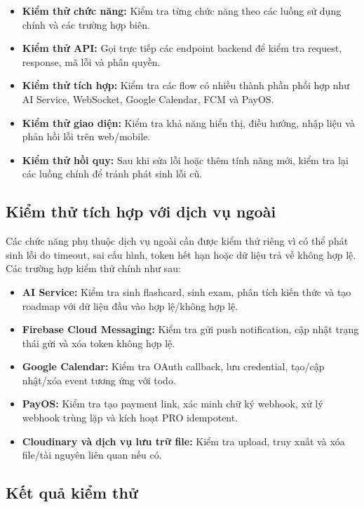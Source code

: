 \begin{itemize}
    \item \textbf{Kiểm thử chức năng:} Kiểm tra từng chức năng theo các luồng sử dụng chính và các trường hợp biên.
    \item \textbf{Kiểm thử API:} Gọi trực tiếp các endpoint backend để kiểm tra request, response, mã lỗi và phân quyền.
    \item \textbf{Kiểm thử tích hợp:} Kiểm tra các flow có nhiều thành phần phối hợp như AI Service, WebSocket, Google Calendar, FCM và PayOS.
    \item \textbf{Kiểm thử giao diện:} Kiểm tra khả năng hiển thị, điều hướng, nhập liệu và phản hồi lỗi trên web/mobile.
    \item \textbf{Kiểm thử hồi quy:} Sau khi sửa lỗi hoặc thêm tính năng mới, kiểm tra lại các luồng chính để tránh phát sinh lỗi cũ.
\end{itemize}

\subsection{Kiểm thử tích hợp với dịch vụ ngoài}
\label{subsec:integration-testing}

Các chức năng phụ thuộc dịch vụ ngoài cần được kiểm thử riêng vì có thể phát sinh lỗi do timeout, sai cấu hình, token hết hạn hoặc dữ liệu trả về không hợp lệ. Các trường hợp kiểm thử chính như sau:

\begin{itemize}
    \item \textbf{AI Service:} Kiểm tra sinh flashcard, sinh exam, phân tích kiến thức và tạo roadmap với dữ liệu đầu vào hợp lệ/không hợp lệ.
    \item \textbf{Firebase Cloud Messaging:} Kiểm tra gửi push notification, cập nhật trạng thái gửi và xóa token không hợp lệ.
    \item \textbf{Google Calendar:} Kiểm tra OAuth callback, lưu credential, tạo/cập nhật/xóa event tương ứng với todo.
    \item \textbf{PayOS:} Kiểm tra tạo payment link, xác minh chữ ký webhook, xử lý webhook trùng lặp và kích hoạt PRO idempotent.
    \item \textbf{Cloudinary và dịch vụ lưu trữ file:} Kiểm tra upload, truy xuất và xóa file/tài nguyên liên quan nếu có.
\end{itemize}

\subsection{Kết quả kiểm thử}

